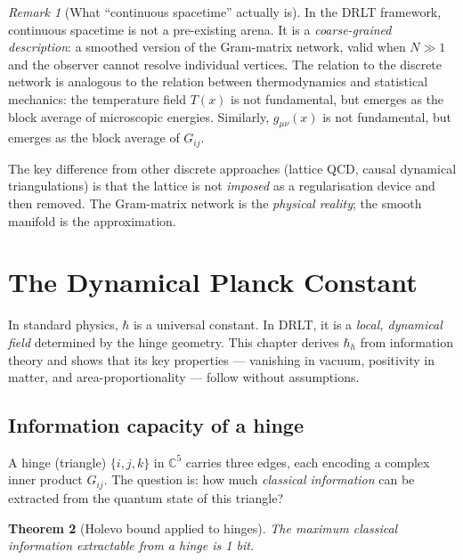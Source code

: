 \documentclass[12pt]{article}
\newtheorem{theorem}{Theorem}[section]
\theoremstyle{remark}
\newtheorem{remark}[theorem]{Remark}
\theoremstyle{definition}
\newcommand{\CC}{\mathbb{C}}
\begin{document}
\begin{remark}[What ``continuous spacetime'' actually is]
In the DRLT framework, continuous spacetime is not a pre-existing arena.  It is a \emph{coarse-grained description}: a smoothed version of the Gram-matrix network, valid when $N \gg 1$ and the observer cannot resolve individual vertices.  The relation to the discrete network is analogous to the relation between thermodynamics and statistical mechanics: the temperature field $T(x)$ is not fundamental, but emerges as the block average of microscopic energies.  Similarly, $g_{\mu\nu}(x)$ is not fundamental, but emerges as the block average of $G_{ij}$.

The key difference from other discrete approaches (lattice QCD, causal dynamical triangulations) is that the lattice is not \emph{imposed} as a regularisation device and then removed.  The Gram-matrix network is the \emph{physical reality}; the smooth manifold is the approximation.
\end{remark}

\section{The Dynamical Planck Constant}
\label{ch:hbar}

In standard physics, $\hbar$ is a universal constant. In DRLT, it is a \emph{local, dynamical field} determined by the hinge geometry. This chapter derives $\hbar_h$ from information theory and shows that its key properties --- vanishing in vacuum, positivity in matter, and area-proportionality --- follow without assumptions.

\subsection{Information capacity of a hinge}

A hinge (triangle) $\{i, j, k\}$ in $\CC^5$ carries three edges, each encoding a complex inner product $G_{ij}$. The question is: how much \emph{classical information} can be extracted from the quantum state of this triangle?

\begin{theorem}[Holevo bound applied to hinges]
\label{thm:holevo}
The maximum classical information extractable from a hinge is 1 bit.
\end{theorem}
\end{document}
